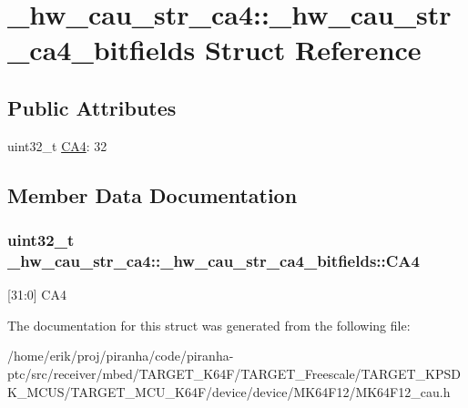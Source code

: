\hypertarget{struct__hw__cau__str__ca4_1_1__hw__cau__str__ca4__bitfields}{}\section{\+\_\+hw\+\_\+cau\+\_\+str\+\_\+ca4\+:\+:\+\_\+hw\+\_\+cau\+\_\+str\+\_\+ca4\+\_\+bitfields Struct Reference}
\label{struct__hw__cau__str__ca4_1_1__hw__cau__str__ca4__bitfields}
\subsection*{Public Attributes}
\begin{DoxyCompactItemize}
\item 
uint32\+\_\+t \hyperlink{struct__hw__cau__str__ca4_1_1__hw__cau__str__ca4__bitfields_a2d6a9d97620edfc9d9a2b353e54cc2eb}{C\+A4}\+: 32
\end{DoxyCompactItemize}


\subsection{Member Data Documentation}
\subsubsection[{\texorpdfstring{C\+A4}{CA4}}]{\setlength{\rightskip}{0pt plus 5cm}uint32\+\_\+t \+\_\+hw\+\_\+cau\+\_\+str\+\_\+ca4\+::\+\_\+hw\+\_\+cau\+\_\+str\+\_\+ca4\+\_\+bitfields\+::\+C\+A4}\hypertarget{struct__hw__cau__str__ca4_1_1__hw__cau__str__ca4__bitfields_a2d6a9d97620edfc9d9a2b353e54cc2eb}{}\label{struct__hw__cau__str__ca4_1_1__hw__cau__str__ca4__bitfields_a2d6a9d97620edfc9d9a2b353e54cc2eb}
\mbox{[}31\+:0\mbox{]} C\+A4 

The documentation for this struct was generated from the following file\+:\begin{DoxyCompactItemize}
\item 
/home/erik/proj/piranha/code/piranha-\/ptc/src/receiver/mbed/\+T\+A\+R\+G\+E\+T\+\_\+\+K64\+F/\+T\+A\+R\+G\+E\+T\+\_\+\+Freescale/\+T\+A\+R\+G\+E\+T\+\_\+\+K\+P\+S\+D\+K\+\_\+\+M\+C\+U\+S/\+T\+A\+R\+G\+E\+T\+\_\+\+M\+C\+U\+\_\+\+K64\+F/device/device/\+M\+K64\+F12/M\+K64\+F12\+\_\+cau.\+h\end{DoxyCompactItemize}
